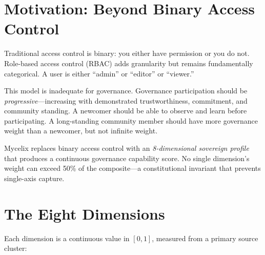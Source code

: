 \documentclass[12pt]{book}
\begin{document}
\section{Motivation: Beyond Binary Access Control}

Traditional access control is binary: you either have permission or you do not.
Role-based access control (RBAC) adds granularity but remains fundamentally
categorical. A user is either ``admin'' or ``editor'' or ``viewer.''

This model is inadequate for governance. Governance participation should be
\emph{progressive}---increasing with demonstrated trustworthiness, commitment,
and community standing. A newcomer should be able to observe and learn before
participating. A long-standing community member should have more governance
weight than a newcomer, but not infinite weight.

Mycelix replaces binary access control with an \emph{8-dimensional sovereign
profile} that produces a continuous governance capability score. No single dimension's weight can exceed 50\% of the composite---a constitutional invariant that prevents single-axis capture.

\section{The Eight Dimensions}

Each dimension is a continuous value in $[0, 1]$, measured from a primary source cluster:
\end{document}
